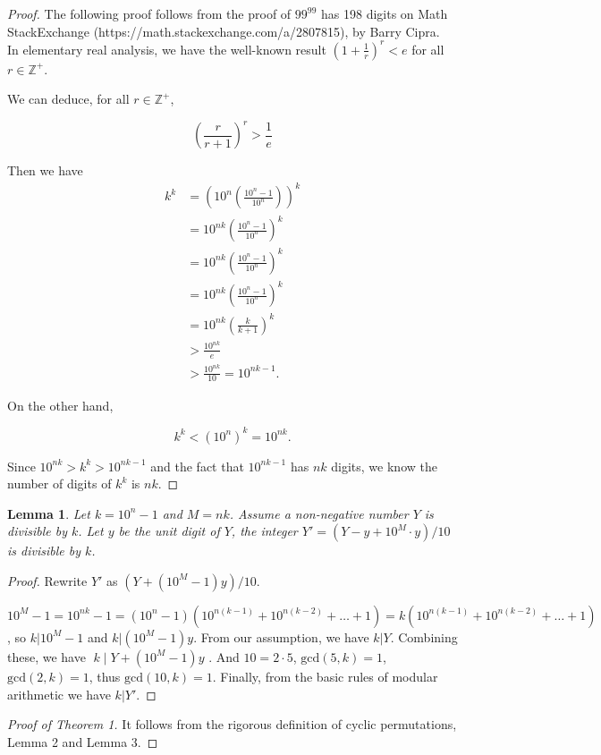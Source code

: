 \documentclass{article}
\newtheorem{lem}[thm]{Lemma}
\begin{document}
\begin{proof}

The following proof follows from the proof of $99^{99}$ has 198 digits on Math StackExchange (https://math.stackexchange.com/a/2807815), by Barry Cipra. \\ In elementary real analysis, we have the well-known result $(1+\frac{1}{r})^r < e$ for all $r \in \mathbb{Z}^+$.

We can deduce, for all $r \in \mathbb{Z}^+$,

\[  (\frac{r}{r+1})^r > \frac{1}{e} \]

Then we have 
\begin{align*}
k^k & = \left( 10^n \left( \frac{10^n-1}{10^n} \right) \right)^k \\
& = 10^{nk} \left( \frac{10^n-1}{10^n} \right)^k \\
& = 10^{nk} \left( \frac{10^n-1}{10^n} \right)^k \\
& = 10^{nk} \left( \frac{10^n-1}{10^n} \right)^k \\
& = 10^{nk} \left( \frac{k}{k+1} \right)^k \\
& > \frac{10^{nk}}{e} \\
& > \frac{10^{nk}}{10} = 10^{nk-1}.
\end{align*}


On the other hand, 

\[ k^k < (10^n)^k = 10^{nk}. \]

Since $10^{nk} > k^k > 10^{nk-1}$ and the fact that $10^{nk-1}$ has $nk$ digits, we know the number of digits of $k^k$ is $nk$.

\end{proof}


\begin{lem}
Let $k = 10^n-1$ and $M = nk$. Assume a non-negative number $Y$ is divisible by $k$. Let $y$ be the unit digit of $Y$, the integer $Y'=(Y-y+10^M \cdot y)/10$ is divisible by $k$.
\end{lem}

\begin{proof}

Rewrite $Y'$ as $(Y+(10^M-1)y)/10$.

$ 10^M-1 = 10^{nk}-1 = (10^n-1)(10^{n(k-1)}+10^{n(k-2)}+\dots+1) = k(10^{n(k-1)}+10^{n(k-2)}+\dots+1)$, so $k|10^M-1$ and $k|(10^M-1)y$. From our assumption, we have $k|Y$. Combining these, we have $\;k\;|\;Y+(10^M-1)y$ . And $10 = 2 \cdot 5$, $\mathrm{gcd}(5, k) = 1$, $\mathrm{gcd}(2, k) = 1$, thus $\mathrm{gcd}(10, k) = 1$. Finally, from the basic rules of modular arithmetic we have $k|Y'$.

\end{proof}

\begin{proof}[Proof of Theorem 1]

It follows from the rigorous definition of cyclic permutations, Lemma 2 and Lemma 3.

\end{proof}
\end{document}
